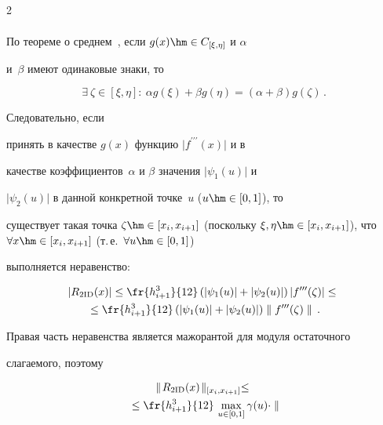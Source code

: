 \begin{multicols}{2}
\begin{multline*}
  \end{multline*}


По теореме о среднем~\cite{2-kir}, если $g(x)\hm\in C_{[\xi,\eta]}$ и $\alpha$ 


и~$\beta$ имеют одинаковые знаки, то 


$$


\exists\ \zeta \in [\xi,\eta]:\ \alpha 


g(\xi) +\beta g(\eta) = (\alpha+\beta) g(\zeta)\,.


$$


 Следовательно, если 


принять в качестве $g(x)$ функцию $\vert f^{\prime\prime\prime}(x)\vert$ и в 


качестве коэффициентов~$\alpha$ и $\beta$  значения $\vert\psi_1(u)\vert$ и 


$\vert\psi_2(u)\vert$ в данной конкретной точке~$u$ ($u\hm\in [0,1]$), то 


существует такая точка $\zeta\hm\in [x_i, x_{i+1}]$ (поскольку $\xi, \eta\hm\in 


[x_i,x_{i+1}]$), что $\forall x\hm\in [x_i,x_{i+1}]$ (т.\,е.\ $\forall u\hm\in [0,1]$) 


выполняется неравенство:


\begin{multline*}


\vert R_{2\mathrm{ID}}(x)\vert \leq \fr{h^3_{i+1}}{12}\left( \vert \psi_1(u)\vert +\vert 


\psi_2(u)\vert \right) \vert f^{\prime\prime\prime}(\zeta)\vert \leq {}\\


{}\leq


\fr{h^3_{i+1}}{12}\left(  \vert \psi_1(u)\vert +\vert \psi_2(u)\vert \right) \parallel 


f^{\prime\prime\prime}(\zeta)\parallel\,.


\end{multline*}


Правая часть неравенства является мажорантой для модуля остаточного 


слагаемого, поэтому


\begin{multline*}


\parallel\! R_{2\mathrm{ID}}(x) \!\parallel_{[x_i,x_{i+1}]} \leq {}\\


{}\leq


\fr{h^3_{i+1}}{12}\,\max\limits_{u\in [0,1]} \gamma(u)\cdot \parallel 



\end{multline*}
\end{multicols}
